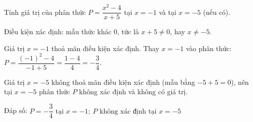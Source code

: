 \begin{problem}[8DS-PS-011]
Tính giá trị của phân thức $P = \dfrac{x^2 - 4}{x + 5}$ tại $x = -1$ và tại $x = -5$ (nếu có).

\begin{solution}
Điều kiện xác định: mẫu thức khác $0$, tức là $x + 5 \neq 0$, hay $x \neq -5$.

Giá trị $x = -1$ thoả mãn điều kiện xác định. Thay $x = -1$ vào phân thức: $P = \dfrac{(-1)^2 - 4}{-1 + 5} = \dfrac{1 - 4}{4} = -\dfrac{3}{4}$.

Giá trị $x = -5$ không thoả mãn điều kiện xác định (mẫu bằng $-5 + 5 = 0$), nên tại $x = -5$ phân thức $P$ không xác định và không có giá trị.

Đáp số: $\boxed{P = -\dfrac{3}{4} \text{ tại } x = -1;\ P \text{ không xác định tại } x = -5}$
\end{solution}
\end{problem}

